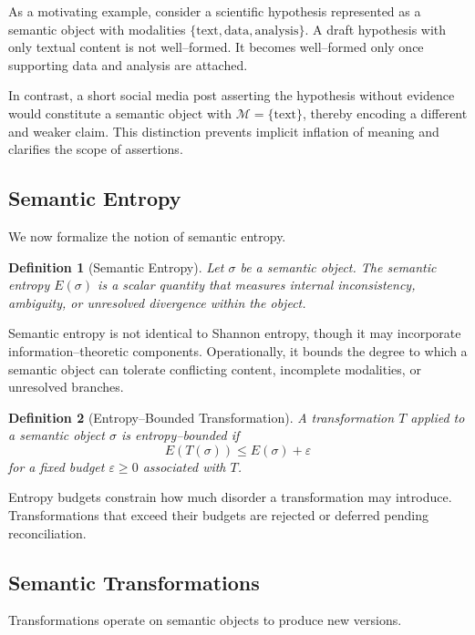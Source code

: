 \documentclass[11pt]{article}
\newtheorem{definition}{Definition}
\begin{document}
As a motivating example, consider a scientific hypothesis represented as a semantic
object with modalities $\{\text{text}, \text{data}, \text{analysis}\}$. A draft
hypothesis with only textual content is not well--formed. It becomes well--formed only
once supporting data and analysis are attached.

In contrast, a short social media post asserting the hypothesis without evidence would
constitute a semantic object with $\mathcal{M} = \{\text{text}\}$, thereby encoding a
different and weaker claim. This distinction prevents implicit inflation of meaning and
clarifies the scope of assertions.

\subsection{Semantic Entropy}

We now formalize the notion of semantic entropy.

\begin{definition}[Semantic Entropy]
Let $\sigma$ be a semantic object. The semantic entropy $E(\sigma)$ is a scalar quantity
that measures internal inconsistency, ambiguity, or unresolved divergence within the
object.
\end{definition}

Semantic entropy is not identical to Shannon entropy, though it may incorporate
information--theoretic components. Operationally, it bounds the degree to which a
semantic object can tolerate conflicting content, incomplete modalities, or unresolved
branches.

\begin{definition}[Entropy--Bounded Transformation]
A transformation $T$ applied to a semantic object $\sigma$ is \emph{entropy--bounded} if
\[
E(T(\sigma)) \leq E(\sigma) + \varepsilon
\]
for a fixed budget $\varepsilon \geq 0$ associated with $T$.
\end{definition}

Entropy budgets constrain how much disorder a transformation may introduce. Transformations
that exceed their budgets are rejected or deferred pending reconciliation.

\subsection{Semantic Transformations}

Transformations operate on semantic objects to produce new versions.
\end{document}
